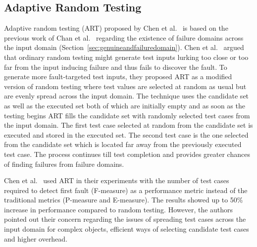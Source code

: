 \subsection{Adaptive Random Testing}
\label{sec:artpatterns_2}
Adaptive random testing (ART) proposed by Chen et al.~\cite{chen2005adaptive} is based on the previous work of Chan et al.~\cite{chan1996proportional} regarding the existence of failure domains across the input domain (Section~\ref{sec:genuineandfailuredomain}). Chen et al.~\cite{chen2005adaptive} argued that ordinary random testing might generate test inputs lurking too close or too far from the input inducing failure and thus fails to discover the fault. To generate more fault-targeted test inputs, they proposed ART as a modified version of random testing where test values are selected at random as usual but are evenly spread across the input domain. The technique uses the candidate set as well as the executed set both of which are initially empty and as soon as the testing begins ART fills the candidate set with randomly selected test cases from the input domain. The first test case selected at random from the candidate set is executed and stored in the executed set. The second test case is the one selected from the candidate set which is located far away from the previously executed test case. The process continues till test completion and provides greater chances of finding failures from failure domains.

Chen et al.~\cite{chen2005adaptive} used ART in their experiments with the number of test cases required to detect first fault (F-measure) as a performance metric instead of the traditional metrics (P-measure and E-measure). The results showed up to 50\% increase in performance compared to random testing. However, the authors pointed out their concern regarding the issues of spreading test cases across the input domain for complex objects, efficient ways of selecting candidate test cases and higher overhead. %

